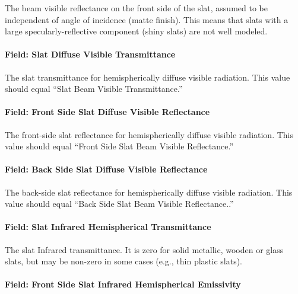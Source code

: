 The beam visible reflectance on the front side of the slat, assumed to be independent of angle of incidence (matte finish). This means that slats with a large specularly-reflective component (shiny slats) are not well modeled.

\paragraph{Field: Slat Diffuse Visible Transmittance}\label{field-slat-diffuse-visible-transmittance}

The slat transmittance for hemispherically diffuse visible radiation. This value should equal ``Slat Beam Visible Transmittance.''

\paragraph{Field: Front Side Slat Diffuse Visible Reflectance}\label{field-front-side-slat-diffuse-visible-reflectance}

The front-side slat reflectance for hemispherically diffuse visible radiation. This value should equal ``Front Side Slat Beam Visible Reflectance.''

\paragraph{Field: Back Side Slat Diffuse Visible Reflectance}\label{field-back-side-slat-diffuse-visible-reflectance}

The back-side slat reflectance for hemispherically diffuse visible radiation. This value should equal ``Back Side Slat Beam Visible Reflectance..''

\paragraph{Field: Slat Infrared Hemispherical Transmittance}\label{field-slat-infrared-hemispherical-transmittance}

The slat Infrared transmittance. It is zero for solid metallic, wooden or glass slats, but may be non-zero in some cases (e.g., thin plastic slats).

\paragraph{Field: Front Side Slat Infrared Hemispherical Emissivity}\label{field-front-side-slat-infrared-hemispherical-emissivity}

